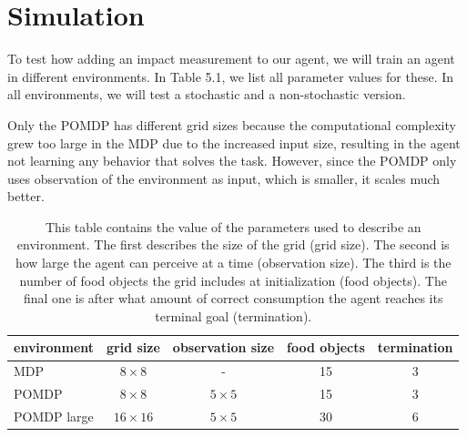 \documentclass[12pt,A4]{report}
\theoremstyle{definition}
\begin{document}


\section{Simulation}
To test how adding an impact measurement to our agent, we will train an agent in different environments. In Table 5.1, we list all parameter values for these. In all environments, we will test a stochastic and a non-stochastic version.

Only the POMDP has different grid sizes because the computational complexity grew too large in the MDP due to the increased input size, resulting in the agent not learning any behavior that solves the task. However, since the POMDP only uses observation of the environment as input, which is smaller, it scales much better.

\begin{table}[H]
  \centering
  \begin{tabular}{l | c | c | c | c}
    environment & grid size & observation size & food objects & termination \\ \hline
    MDP & $8 \times 8$ & - & 15 & 3\\
    POMDP & $8 \times 8$ & $5 \times 5$ & 15 & 3\\
    POMDP large & $16 \times 16$ & $5 \times 5$ & 30 & 6\\
  \end{tabular}
  \label{tab:sim_parms}
  \caption{This table contains the value of the parameters used to describe an environment. The first describes the size of the grid (grid size). The second is how large the agent can perceive at a time (observation size). The third is the number of food objects the grid includes at initialization (food objects). The final one is after what amount of correct consumption the agent reaches its terminal goal (termination).}
\end{table}
\end{document}
